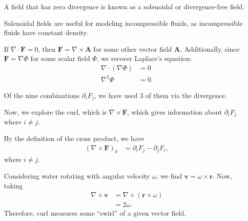 \documentclass[10pt]{mypackage}
\begin{document}
\begin{definition}
  A field that has zero divergence is known as a solenoidal or divergence-free field.\newline

  Solenoidal fields are useful for modeling incompressible fluids, as incompressible fluids have constant density.\newline

  If $\nabla \cdot \mathbf{F} = 0$, then $\mathbf{F} = \nabla \times \mathbf{A}$ for some other vector field $\mathbf{A}$. Additionally, since $\mathbf{F} = \nabla \Phi$ for some scalar field $\Phi$, we recover Laplace's equation:
  \begin{align*}
    \nabla\cdot \left(\nabla \Phi\right) &= 0\\
    \nabla^2\Phi &= 0.
  \end{align*}
\end{definition}
\begin{example}
  Of the nine combinations $\partial_i F_j$, we have used $3$ of them via the divergence.\newline

  Now, we explore the curl, which is $\nabla \times \mathbf{F}$, which gives information about $\partial_iF_j$ where $i \neq j$.\newline

  By the definition of the cross product, we have
  \begin{align*}
    \left(\nabla \times \mathbf{F}\right)_{k} &= \partial_iF_j - \partial_jF_i,
  \end{align*} 
  where $i\neq j$.\newline

  Considering water rotating with angular velocity $\omega$, we find $\mathbf{v} = \omega\times \mathbf{r}$. Now, taking
  \begin{align*}
    \nabla \times \mathbf{v} &= \nabla \times \left(\mathbf{r}\times \omega\right)\\
                             &= 2\omega.
  \end{align*}
  Therefore, curl measures some ``swirl'' of a given vector field.
\end{example}
\end{document}
